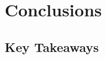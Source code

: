 \documentclass[11pt,a4paper]{article}
\begin{document}


\section{Conclusions}

\subsection{Key Takeaways}
\end{document}
